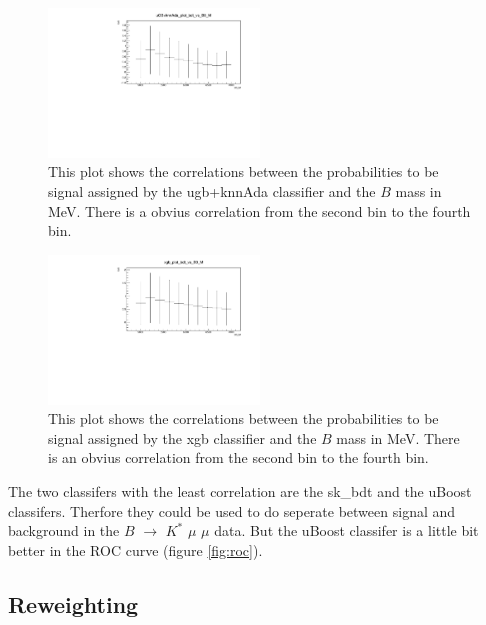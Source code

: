 \documentclass[english]{uzhpub}
\begin{document}
 \begin{figure}[H]
  \centering
  \includegraphics[width=0.5\textwidth]{plots/uGB+knnAda_plot_bdt_vs_B0_M}
  \caption{This plot shows the correlations between the probabilities to be signal assigned by the ugb+knnAda classifier and the $B$ mass in MeV. There is a obvius correlation from the second bin to the fourth bin.}
  \label{fig:uGB+knnAdaB0M}
 \end{figure}

 \begin{figure}[H]
  \centering
  \includegraphics[width=0.5\textwidth]{plots/xgb_plot_bdt_vs_B0_M}
  \caption{This plot shows the correlations between the probabilities to be signal assigned by the xgb classifier and the $B$ mass in MeV. There is an obvius correlation from the second bin to the fourth bin.}
  \label{fig:xgbB0M}
 \end{figure}

 The two classifers with the least correlation are the sk\_bdt and the uBoost classifers. Therfore they could be used to do seperate between signal and background in the $B$ $\rightarrow$ $K^{*}$ $\mu$ $\mu$ data. But the uBoost classifer is a little bit better in the ROC curve (figure \ref{fig:roc}).



 \subsection{Reweighting} \label{sec:Reweight}

\end{document}
